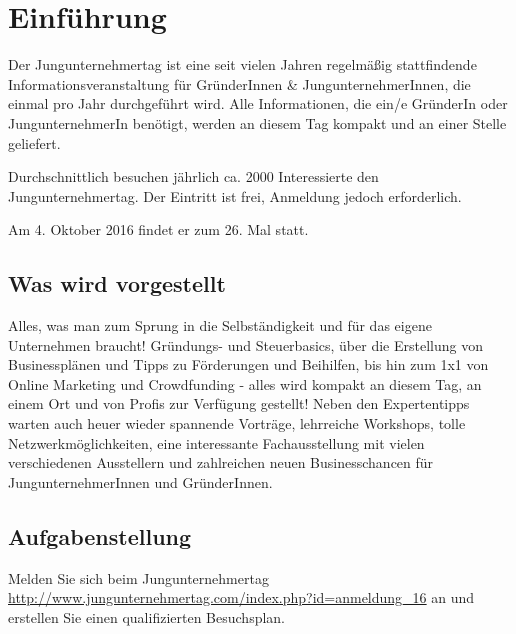 
\section{Einführung}
Der Jungunternehmertag ist eine seit vielen Jahren regelmäßig stattfindende Informationsveranstaltung für GründerInnen \& JungunternehmerInnen, die einmal pro Jahr durchgeführt wird. Alle Informationen, die ein/e GründerIn oder JungunternehmerIn benötigt, werden an diesem Tag kompakt und an einer Stelle geliefert.

Durchschnittlich besuchen jährlich ca. 2000 Interessierte den Jungunternehmertag.
Der Eintritt ist frei, Anmeldung jedoch erforderlich.

Am 4. Oktober 2016 findet er zum 26. Mal statt. 

\subsection{Was wird vorgestellt}
Alles, was man zum Sprung in die Selbständigkeit und für das eigene Unternehmen braucht! Gründungs- und Steuerbasics, über die Erstellung von Businessplänen und Tipps zu Förderungen und Beihilfen, bis hin zum 1x1 von Online Marketing und Crowdfunding - alles wird kompakt an diesem Tag, an einem Ort und von Profis zur Verfügung gestellt!
Neben den Expertentipps warten auch heuer wieder spannende Vorträge, lehrreiche Workshops, tolle Netzwerkmöglichkeiten, eine interessante Fachausstellung mit vielen verschiedenen Ausstellern und zahlreichen neuen Businesschancen für JungunternehmerInnen und GründerInnen. 


\subsection{Aufgabenstellung}
Melden Sie sich beim Jungunternehmertag \url{http://www.jungunternehmertag.com/index.php?id=anmeldung_16} an und erstellen Sie einen qualifizierten Besuchsplan.

\clearpage
